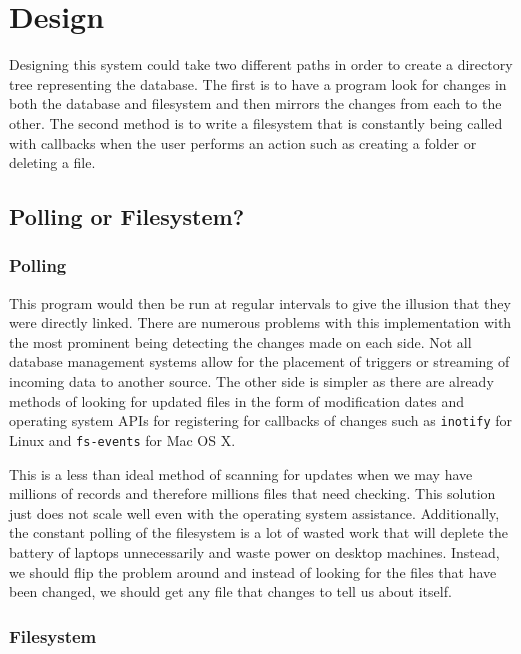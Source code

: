 \chapter{Design}

Designing this system could take two different paths in order to create a directory tree representing the database. The first is to have a program look for changes in both the database and filesystem and then mirrors the changes from each to the other. The second method is to write a filesystem that is constantly being called with callbacks when the user performs an action such as creating a folder or deleting a file.

\section{Polling or Filesystem?}

\subsection{Polling}

This program would then be run at regular intervals to give the illusion that they were directly linked. There are numerous problems with this implementation with the most prominent being detecting the changes made on each side. Not all database management systems allow for the placement of triggers or streaming of incoming data to another source. The other side is simpler as there are already methods of looking for updated files in the form of modification dates and operating system APIs for registering for callbacks of changes such as \texttt{inotify} for Linux and \texttt{fs-events} for Mac OS X.

This is a less than ideal method of scanning for updates when we may have millions of records and therefore millions files that need checking. This solution just does not scale well even with the operating system assistance. Additionally, the constant polling of the filesystem is a lot of wasted work that will deplete the battery of laptops unnecessarily and waste power on desktop machines. Instead, we should flip the problem around and instead of looking for the files that have been changed, we should get any file that changes to tell us about itself.

\subsection{Filesystem}

